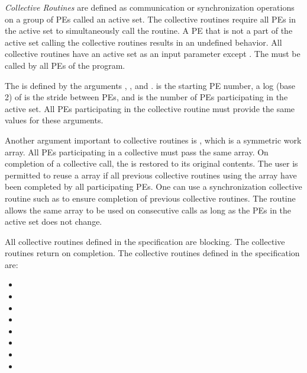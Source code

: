 \emph{Collective Routines} are defined as communication or synchronization
operations on a group of \acp{PE} called an active set. The collective
routines require all \acp{PE} in the active set to simultaneously call the
routine.  A \ac{PE} that is not a part of the active set calling the collective
routines results in an undefined behavior.  All collective routines have an
active set as an input parameter except . The  must be
called by all \acp{PE} of the \openshmem program. 


The \activeset is defined by the arguments , ,
and .   is the starting \ac{PE} number, a log (base
2) of  is the stride between \acp{PE}, and  is
the number of \acp{PE} participating in the active set.  All \acp{PE}
participating in the collective routine must provide the same values for these
arguments. 
 
Another argument important to collective routines is , which is a
symmetric work array.  All \acp{PE} participating in a collective must pass the
same  array.  On completion of a collective call, the  is
restored to its original contents.  The user is permitted to reuse a 
array if all previous collective routines using the  array have been
completed by all participating \acp{PE}.  One can use a synchronization
collective routine such as  to ensure completion of previous collective
routines. The  routine allows the same  array to
be used on consecutive calls as long as the \acp{PE} in the active set does not change. 


All collective routines defined in the specification are blocking.  The
collective routines return on completion.  The collective routines defined in
the \openshmem specification are:

\begin{itemize}
\item[] \broadcast 
\item[] \barrier
\item[] \barrierall
\item[] \collect
\item[] \fcollect
\item[] \reduction
\item[] \alltoall
\item[] \alltoalls
\end{itemize} 

